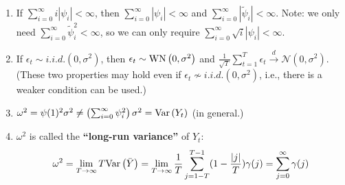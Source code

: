 \documentclass[11pt]{elegantbook}
\begin{document}
\begin{remark}
    \begin{enumerate}
        \item If $\sum_{i=0}^\infty i|\psi_i|<\infty$, then $\sum_{i=0}^\infty |\psi_i|<\infty$ and $\sum_{i=0}^\infty |\tilde{\psi}_i|<\infty$. Note: we only need $\sum_{i=0}^\infty \tilde{\psi}_i^2<\infty$, so we can only require $\sum_{i=0}^\infty \sqrt{i}|\psi_i|<\infty$.
        \item If $\epsilon_t\sim{i.i.d.}\left(0,\sigma^2\right)$, then $\epsilon_t\sim \textnormal{WN}\left(0,\sigma^2\right)$ and $\frac{1}{\sqrt{T}}\sum_{t=1}^T\epsilon_t \stackrel{d}{\longrightarrow} \mathcal{N}\left(0,\sigma^2\right)$. (These two properties may hold even if $\epsilon_t\nsim{i.i.d.}\left(0,\sigma^2\right)$, i.e., there is a weaker condition can be used.)
        \item $\omega^2=\psi(1)^2\sigma^2\neq \left(\sum_{i=0}^\infty \psi_i^2\right)\sigma^2=\textnormal{Var}\left(Y_t\right)$ (in general.)
        \item $\omega^2$ is called the \textbf{``long-run variance''} of $Y_t$:
        \begin{equation}
            \begin{aligned}
                \omega^2=\lim_{T \rightarrow \infty} T \textnormal{Var}\left(\bar{Y}\right)
                =\lim_{T \rightarrow \infty} \frac{1}{T}\sum_{j=1-T}^{T-1}(1-\frac{|j|}{T})\gamma(j)
                =\sum_{j=0}^\infty \gamma(j)
            \end{aligned}
            \nonumber
        \end{equation}
    \end{enumerate}
\end{remark}
\end{document}
